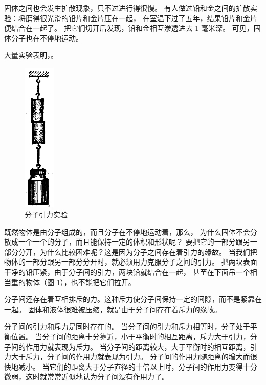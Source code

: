 固体之间也会发生扩散现象，只不过进行得很慢。
有人做过铅和金之间的扩散实验：将磨得很光滑的铅片和金片压在一起，
在室温下过了五年，结果铅片和金片便结合在一起了。
把它们切开后发现，铅和金相互渗透进去 1 毫米深。
可见，固体分子也在不停地运动。

大量实验表明，。

\begin{figure}
    \centering
    \includegraphics[width=1.5cm]{../pic/czwl2-ch5-2}
    \caption{分子引力实验}\label{fig:5-2}
\end{figure}

既然物体是由分子组成的，而且分子在不停地运动着，那么，
为什么固体不会分散成一个一个的分子，而且能保持一定的体积和形状呢？
要把它的一部分跟另一部分分开，为什么比较困难呢？这是因为分子之间存在着引力的缘故。
当我们把物体的一部分跟另一部分分开时，就必须用力克服分子之间的引力。
把两块表面干净的铅压紧，由于分子间的引力，两块铅就结合在一起，
甚至在下面吊一个相当重的物体（图 \ref{fig:5-2}），也不能把它们拉开。

分子间还存在着互相排斥的力。这种斥力使分子间保持一定的间隙，而不是紧靠在一起。
固体和液体很难被压缩，就是由于分子间存在着斥力的缘故。

分子间的引力和斥力是同时存在的。
当分子间的引力和斥力相等时，分子处于平衡位置。
当分子间的距离十分靠近，小于平衡时的相互距离，斥力大于引力，分子间的作用力就表现为斥力。
当分子间的距离较大，大于平衡时的相互距离，引力大于斥力，分子间的作用力就表现为引力。
分子间的作用力随距离的增大而很快地减小。
当它们的距离大于分子直径的十倍以上时，分子间的作用力变得十分微弱，这时就常常近似地认为分子间没有作用力了。


